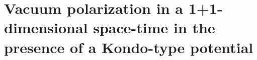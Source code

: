 \chapter{Vacuum polarization in a 1+1-dimensional space-time in the presence of a Kondo-type potential}\label{chap-vacuum}

%

%
%
%


